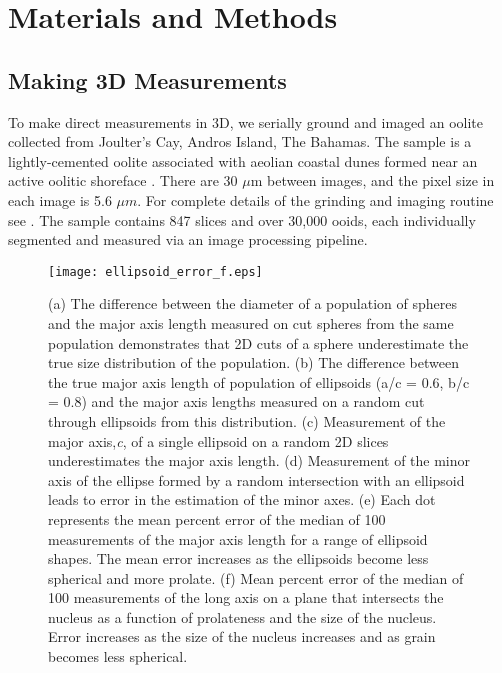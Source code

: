 \documentclass[draft]{agujournal2019}
\begin{document}
\section{Materials and Methods}
\subsection{Making 3D Measurements}
To make direct measurements in 3D, we serially ground and imaged an oolite collected from Joulter's Cay, Andros Island, The Bahamas. The sample is a lightly-cemented oolite associated with aeolian coastal dunes formed near an active oolitic shoreface \cite{halley1979fresh}. There are 30 \(\mu\)m between images, and the pixel size in each image is 5.6 \(\mu m\). For complete details of the grinding and imaging routine see . The sample contains 847 slices and over 30,000 ooids, each individually segmented and measured via an image processing pipeline.



\begin{figure}
    \centering
    \texttt{[image: ellipsoid\_error\_f.eps]}
    \caption{(a) The difference between the diameter of a population of spheres and the major axis length measured on cut spheres from the same population demonstrates that 2D cuts of a sphere underestimate the true size distribution of the population. (b) The difference between the true major axis length of population of ellipsoids (a/c = 0.6, b/c = 0.8) and the major axis lengths measured on a random cut through ellipsoids from this distribution. (c) Measurement of the major axis,\textit{c}, of a single ellipsoid on a random 2D slices underestimates the major axis length. (d) Measurement of the minor axis of the ellipse formed by a random intersection with an ellipsoid leads to error in the estimation of the minor axes. (e) Each dot represents the mean percent error of the median of 100 measurements of the major axis length for a range of ellipsoid shapes. The mean error increases as the ellipsoids become less spherical and more prolate. (f) Mean percent error of the median of 100 measurements of the long axis on a plane that intersects the nucleus as a function of prolateness and the size of the nucleus. Error increases as the size of the nucleus increases and as grain becomes less spherical.}
    \label{fig:sphere_error}
\end{figure}
\end{document}
